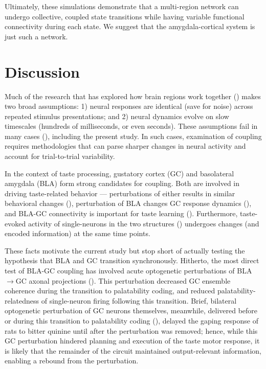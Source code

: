 \begin{refsection}
Ultimately, these simulations demonstrate that a multi-region network can undergo collective, coupled state transitions while having variable functional connectivity during each state. We suggest that the amygdala-cortical system is just such a network.

\section{Discussion}
Much of the research that has explored how brain regions work together (\cite{markov2014a,grabska-barwi2017a,yates2017a,glaser2018a}) makes two broad assumptions: 1) neural responses are identical (save for noise) across repeated stimulus presentations; and 2) neural dynamics evolve on slow timescales (hundreds of milliseconds, or even seconds). These assumptions fail in many cases (\cite{gat1997a,sugase1999a,latimer2015a,jones2007a}), including the present study. In such cases, examination of coupling requires methodologies that can parse sharper changes in neural activity and account for trial-to-trial variability.

In the context of taste processing, gustatory cortex (GC) and basolateral amygdala (BLA) form strong candidates for coupling. Both are involved in driving taste-related behavior --- perturbations of either results in similar behavioral changes (\cite{lovaglio2010a,lin2011a,lin2018a}), perturbation of BLA changes GC response dynamics (\cite{piette2012a}), and BLA-GC connectivity is important for taste learning (\cite{lin2012a}). Furthermore, taste-evoked activity of single-neurons in the two structures (\cite{fontanini2009a,sadacca2012a}) undergoes changes (and encoded information) at the same time points. 

These facts motivate the current study but stop short of actually testing the hypothesis that BLA and GC transition synchronously. Hitherto, the most direct test of BLA-GC coupling has involved acute optogenetic perturbations of BLA$\rightarrow$GC axonal projections (\cite{lin2021a}). This perturbation decreased GC ensemble coherence during the transition to palatability coding, and reduced palatability-relatedness of single-neuron firing following this transition. Brief, bilateral optogenetic perturbation of GC neurons themselves, meanwhile, delivered before or during this transition to palatability coding (\cite{mukherjee2019a}), delayed the gaping response of rats to bitter quinine until after the perturbation was removed; hence, while this GC perturbation hindered planning and execution of the taste motor response, it is likely that the remainder of the circuit maintained output-relevant information, enabling a rebound from the perturbation. 


\end{refsection}
